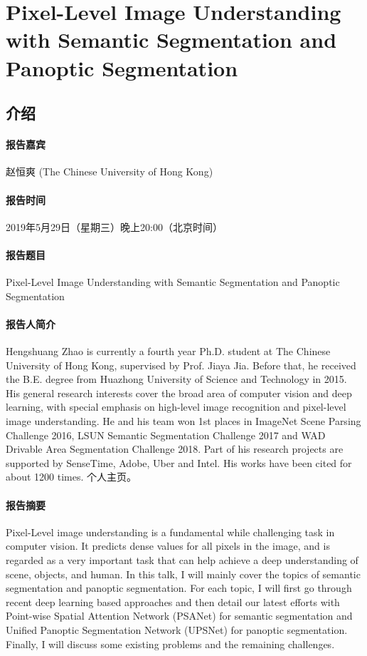 \documentclass[UTF8]{ctexart}
\begin{document}
\section{Pixel-Level Image Understanding with Semantic Segmentation and Panoptic Segmentation}

\subsection{介绍}

\paragraph{报告嘉宾}赵恒爽 (The Chinese University of Hong Kong)

\paragraph{报告时间}2019年5月29日（星期三）晚上20:00（北京时间）

\paragraph{报告题目}Pixel-Level Image Understanding with Semantic Segmentation and Panoptic Segmentation

\paragraph{报告人简介}
Hengshuang Zhao is currently a fourth year Ph.D. student at The Chinese University of Hong Kong, supervised by Prof. Jiaya Jia. 
Before that, he received the B.E. degree from Huazhong University of Science and Technology in 2015. 
His general research interests cover the broad area of computer vision and deep learning, with special emphasis on high-level image recognition and pixel-level image understanding. 
He and his team won 1st places in ImageNet Scene Parsing Challenge 2016, LSUN Semantic Segmentation Challenge 2017 and WAD Drivable Area Segmentation Challenge 2018. 
Part of his research projects are supported by SenseTime, Adobe, Uber and Intel. His works have been cited for about 1200 times.
个人主页\cite{Hengshuang}。

\paragraph{报告摘要}
Pixel-Level image understanding is a fundamental while challenging task in computer vision. It predicts dense values for all pixels in the image, and is regarded as a very important task that can help achieve a deep understanding of scene, objects, and human. In this talk, I will mainly cover the topics of semantic segmentation and panoptic segmentation. For each topic, I will first go through recent deep learning based approaches and then detail our latest efforts with Point-wise Spatial Attention Network (PSANet) for semantic segmentation and Unified Panoptic Segmentation Network (UPSNet) for panoptic segmentation. Finally, I will discuss some existing problems and the remaining challenges.
\end{document}
